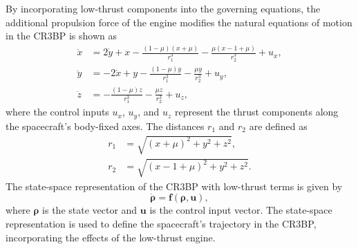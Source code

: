 \documentclass[conference]{IEEEtran}
\begin{document}
 By incorporating low-thrust components into the governing equations, the additional propulsion force of the engine modifies the natural equations of motion in the CR3BP is shown as	
\begin{align}
		\ddot{x} &= 2\dot{y} + x - \frac{(1-\mu)(x+\mu)}{r_1^3} - \frac{\mu(x-1+\mu)}{r_2^3} + u_x, \\
		\ddot{y} &= -2\dot{x} + y - \frac{(1-\mu)y}{r_1^3} - \frac{\mu y}{r_2^3} + u_y, \\
		\ddot{z} &= -\frac{(1-\mu)z}{r_1^3} - \frac{\mu z}{r_2^3} + u_z,
\end{align}
where the control inputs \( u_x \), \( u_y \), and \( u_z \) represent the thrust components along the spacecraft's body-fixed axes. The distances \( r_1 \) and \( r_2 \) are defined as
\begin{align}
	r_1 &= \sqrt{(x+\mu)^2 + y^2 + z^2}, \\
	r_2 &= \sqrt{(x-1+\mu)^2 + y^2 + z^2}.
\end{align}
The state-space representation of the CR3BP with low-thrust terms is given by
\begin{equation}
	\dot{\boldsymbol{\rho}} = \boldsymbol{f}(\boldsymbol{\rho}, \boldsymbol{u}),
\end{equation}
where \( \boldsymbol{\rho} \) is the state vector and \( \boldsymbol{u} \) is the control input vector. The state-space representation is used to define the spacecraft's trajectory in the CR3BP, incorporating the effects of the low-thrust engine.
\end{document}
